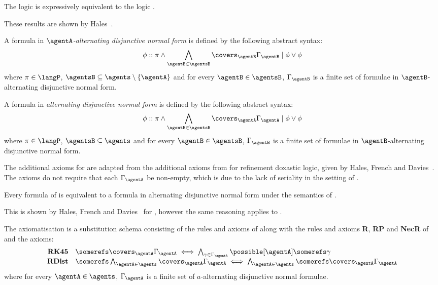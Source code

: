 \documentclass[twoside]{aiml14}
\begin{document}
  \begin{proposition}
      The logic \logicAamlK{} is expressively equivalent to the logic \logicK{}.
  \end{proposition}

  These results are shown by Hales~\cite{hales2013}.

  \begin{definition}\label{adnf}
      A formula in {\em $\agentA$-alternating disjunctive normal form} is defined by the following abstract syntax:
      $$
      \phi :: \pi \land \bigwedge_{\agentB \in \agentsB} \covers_\agentB \Gamma_\agentB \mid \phi \lor \phi
      $$
      where $\pi \in \langP$, $\agentsB \subseteq \agents \setminus \{\agentA\}$ and for every $\agentB \in \agentsB$,
      $\Gamma_\agentB$ is a finite set of formulae in $\agentB$-alternating disjunctive normal form.

      A formula in {\em alternating disjunctive normal form} is defined by the following abstract syntax:
      $$
      \phi :: \pi \land \bigwedge_{\agentB \in \agentsB} \covers_\agentA \Gamma_\agentA \mid \phi \lor \phi
      $$
      where $\pi \in \langP$, $\agentsB \subseteq \agents$ and for every $\agentB \in \agentsB$,
      $\Gamma_\agentB$ is a finite set of formulae in $\agentB$-alternating disjunctive normal form.
  \end{definition}
  
  The additional axioms for \axiomAamlKFF{} are adapted from the additional
  axioms from \axiomRmlKD{} for refinement doxastic logic, given by Hales, French
  and Davies~\cite{hales2012}. The axioms do not require that each
  $\Gamma_\agentA$ be non-empty, which is due to the lack of seriality in the
  setting of \classKFF{}.

  \begin{proposition}
      Every formula of \lang{} is equivalent to a formula in alternating
      disjunctive normal form under the semantics of \logicKFF{}.
  \end{proposition}

  This is shown by Hales, French and Davies~\cite{hales2012} for \logicKD{},
  however the same reasoning applies to \logicKFF{}.

  \begin{definition}
      The axiomatisation \axiomAmlKFF{} is a substitution schema consisting of
      the rules and axioms of \axiomAmlKFF{} along with the rules and axioms
      {\bf R}, {\bf RP} and {\bf NecR} of \axiomAamlK{} and the axioms:
      $$
      \begin{array}{rl}
          {\bf RK45}  & \somerefs \covers_\agentA \Gamma_\agentA \iff \bigwedge_{\gamma \in \Gamma_\agentA} \possible[\agentA] \somerefs \gamma\\
          {\bf RDist}  & \somerefs \bigwedge_{\agentA \in \agents} \covers_\agentA \Gamma_\agentA \iff \bigwedge_{\agentA \in \agents} \somerefs \covers_\agentA \Gamma_\agentA
      \end{array}
      $$
      where for every $\agentA \in \agents$, $\Gamma_\agentA$ is a finite set
      of $a$-alternating disjunctive normal formulae.
  \end{definition}
\end{document}
